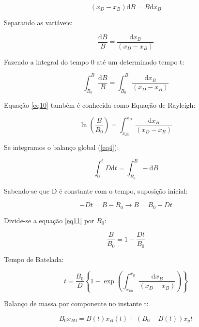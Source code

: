 \begin{equation}\label{eq7}
(x_{D} - x_{B}) \mathrm{d}B = B\mathrm{d} x_{B}
\end{equation}

Separando as variáveis:

\begin{equation}\label{eq8}
\frac{\mathrm{d} B}{B} = \frac{\mathrm{d} x_{B}}{(x_{D} - x_{B})}
\end{equation}

Fazendo a integral do tempo 0 até um determinado tempo t:

\begin{equation}\label{eq9}
\int_{B_{0}}^{B} \frac{\mathrm{d}B}{B} = \int_{B_{0}}^{B} \frac{\mathrm{d}x_{B}}{(x_{D} - x_{B})}
\end{equation}


Equação \ref{eq10} também é conhecida como Equação de Rayleigh:

\begin{equation}\label{eq10}
\ln (\frac{B}{B_{0}}) = \int_{x_{B0}}^{x_{B}} \frac{\mathrm{d}x_{B}}{(x_{D} - x_{B})}
\end{equation}

Se integramos o balanço global (\ref{eq4}):

\begin{equation}\label{eq11}
\int_{0}^{t} D \mathrm{d}t = \int_{B_{0}}^{B} -\mathrm{d}B
\end{equation}

Sabendo-se que D é constante com o tempo, suposição inicial:

\begin{equation}\label{eq12}
-D t = B - B_{0} \rightarrow B = B_{0} - Dt
\end{equation}

Divide-se a equação \ref{eq11} por $B_{0}$:

\begin{equation}\label{eq13}
\frac{B}{B_{0}} = 1 - \frac{Dt}{B_{0}}
\end{equation}


Tempo de Batelada:

\begin{equation}\label{eq14}
t = \frac{B_{0}}{D} \left \{ 1 - \exp \left ( \int_{x_{B0}}^{x_{B}}  \frac{\mathrm{d} x_{B}}{(x_{D}-x_{B})} \right ) \right \}
\end{equation}

Balanço de massa por componente no instante t:

\begin{equation}\label{eq15}
B_{0} x_{B0} = B(t)x_{B}(t) + (B_{0} - B(t))x_{p}t
\end{equation}

